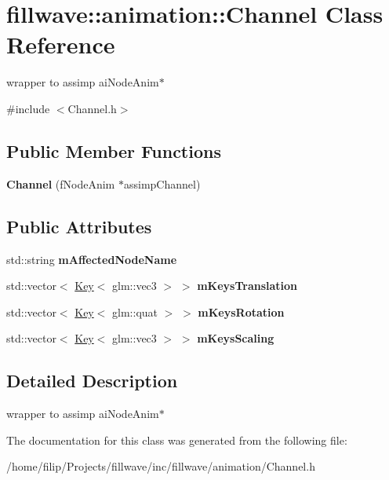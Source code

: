 \hypertarget{classfillwave_1_1animation_1_1Channel}{}\section{fillwave\+:\+:animation\+:\+:Channel Class Reference}
\label{classfillwave_1_1animation_1_1Channel}


wrapper to assimp ai\+Node\+Anim$\ast$  




{\ttfamily \#include $<$Channel.\+h$>$}

\subsection*{Public Member Functions}
\begin{DoxyCompactItemize}
\item 
\hypertarget{classfillwave_1_1animation_1_1Channel_ab888f2f914596577a8db9e8ffd3402d8}{}{\bfseries Channel} (f\+Node\+Anim $\ast$assimp\+Channel)\label{classfillwave_1_1animation_1_1Channel_ab888f2f914596577a8db9e8ffd3402d8}

\end{DoxyCompactItemize}
\subsection*{Public Attributes}
\begin{DoxyCompactItemize}
\item 
\hypertarget{classfillwave_1_1animation_1_1Channel_a09662a0c98b28ddf31d51eb3b36b3197}{}std\+::string {\bfseries m\+Affected\+Node\+Name}\label{classfillwave_1_1animation_1_1Channel_a09662a0c98b28ddf31d51eb3b36b3197}

\item 
\hypertarget{classfillwave_1_1animation_1_1Channel_a4845f2bb5d2379d2d724aa12b4e256b1}{}std\+::vector$<$ \hyperlink{classfillwave_1_1animation_1_1Key}{Key}$<$ glm\+::vec3 $>$ $>$ {\bfseries m\+Keys\+Translation}\label{classfillwave_1_1animation_1_1Channel_a4845f2bb5d2379d2d724aa12b4e256b1}

\item 
\hypertarget{classfillwave_1_1animation_1_1Channel_a9378f708d1f62adc7270f18a5571f74f}{}std\+::vector$<$ \hyperlink{classfillwave_1_1animation_1_1Key}{Key}$<$ glm\+::quat $>$ $>$ {\bfseries m\+Keys\+Rotation}\label{classfillwave_1_1animation_1_1Channel_a9378f708d1f62adc7270f18a5571f74f}

\item 
\hypertarget{classfillwave_1_1animation_1_1Channel_a42ea94e79ed5ebc72c2c85c866d04139}{}std\+::vector$<$ \hyperlink{classfillwave_1_1animation_1_1Key}{Key}$<$ glm\+::vec3 $>$ $>$ {\bfseries m\+Keys\+Scaling}\label{classfillwave_1_1animation_1_1Channel_a42ea94e79ed5ebc72c2c85c866d04139}

\end{DoxyCompactItemize}


\subsection{Detailed Description}
wrapper to assimp ai\+Node\+Anim$\ast$ 

The documentation for this class was generated from the following file\+:\begin{DoxyCompactItemize}
\item 
/home/filip/\+Projects/fillwave/inc/fillwave/animation/Channel.\+h\end{DoxyCompactItemize}
